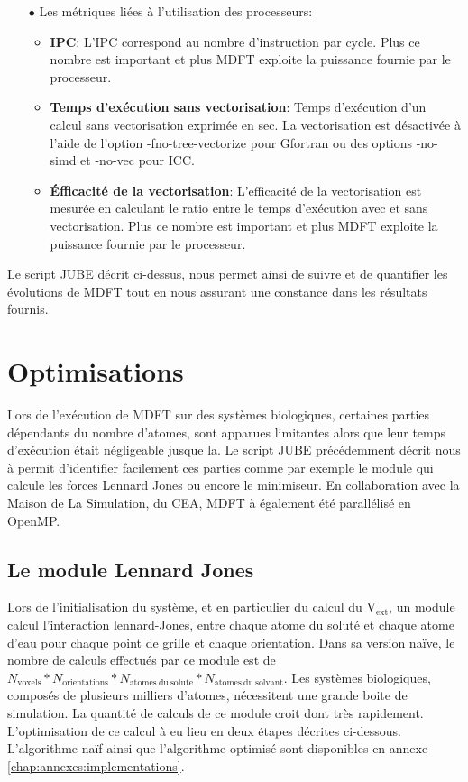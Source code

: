\begin{itemize}
\item[$\bullet$] Les métriques liées à l'utilisation des processeurs:
  \begin{itemize}
  \item \textbf{IPC}: L'IPC correspond au nombre d'instruction par cycle. Plus ce nombre est important et plus MDFT exploite la puissance fournie par le processeur.
  \item \textbf{Temps d'exécution sans vectorisation}: Temps d’exécution d'un calcul sans vectorisation exprimée en sec. La vectorisation est désactivée à l'aide de l'option -fno-tree-vectorize pour Gfortran ou des options -no-simd et -no-vec pour ICC. 
  \item \textbf{\'Efficacité de la vectorisation}: L'efficacité de la vectorisation est mesurée en calculant le ratio entre le temps d'exécution avec et sans vectorisation. Plus ce nombre est important et plus MDFT exploite la puissance fournie par le processeur.
  \end{itemize}
  \vspace*{1.5ex}%

\end{itemize}

Le script JUBE décrit ci-dessus, nous permet ainsi de suivre et de quantifier les évolutions de MDFT tout en nous assurant une constance dans les résultats fournis.


\section{Optimisations}
Lors de l'exécution de MDFT sur des systèmes biologiques, certaines parties dépendants du nombre d'atomes, sont apparues limitantes alors que leur temps d'exécution était négligeable jusque la. Le script JUBE précédemment décrit nous à permit d'identifier facilement ces parties comme par exemple le module qui calcule les forces Lennard Jones ou encore le minimiseur. En collaboration avec la Maison de La Simulation, du CEA, MDFT à également été parallélisé en OpenMP.


\subsection{Le module Lennard Jones}
Lors de l’initialisation du système, et en particulier du calcul du $\mathrm{V}_\mathrm{ext}$, un module calcul l’interaction lennard-Jones, entre chaque atome du soluté et chaque atome d'eau pour chaque point de grille et chaque orientation. Dans sa version naïve, le nombre de calculs effectués par ce module est de $N_{\mathrm{voxels}}*N_{\mathrm{orientations}}*N_{\mathrm{atomes\ du\ solute}}*N_{\mathrm{atomes\ du\ solvant}}$. Les systèmes biologiques, composés de plusieurs milliers d'atomes, nécessitent une grande boite de simulation. La quantité de calculs de ce module croit dont très rapidement. L'optimisation de ce calcul à eu lieu en deux étapes décrites ci-dessous. L'algorithme naïf ainsi que l'algorithme optimisé sont disponibles en annexe \ref{chap:annexes:implementations}.


